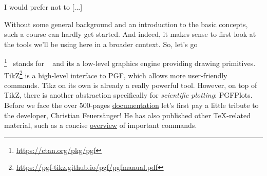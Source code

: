 \epigraph{I would prefer not to [...]}{}

Without some general background and an introduction to the basic concepts, such a course can hardly get started. And indeed, it makes sense to first look at the tools we’ll be using here in a broader context. So, let's go 

 \mypgf\footnote{\url{https://ctan.org/pkg/pgf}}~ stands for \mypgflong~ and its a low-level graphics engine providing drawing primitives. TikZ\footnote{\url{https://pgf-tikz.github.io/pgf/pgfmanual.pdf}} is a high-level interface to PGF, which allows more user-friendly commands. Tikz on its own is already a really powerful tool. However, on top of TikZ, there is another abstraction specifically for \emph{scientific plotting}: PGFPlots. Before we face the over 500-pages \href{https://pgfplots.sourceforge.net/pgfplots.pdf}{documentation} let’s first pay a little tribute to the developer, Christian Feuersänger! He has also published other TeX-related material, such as a concise \href{https://ins.uni-bonn.de/media/public/staff/feuersaenger/MeineKurzReferenz.pdf}{overview} of important commands.
